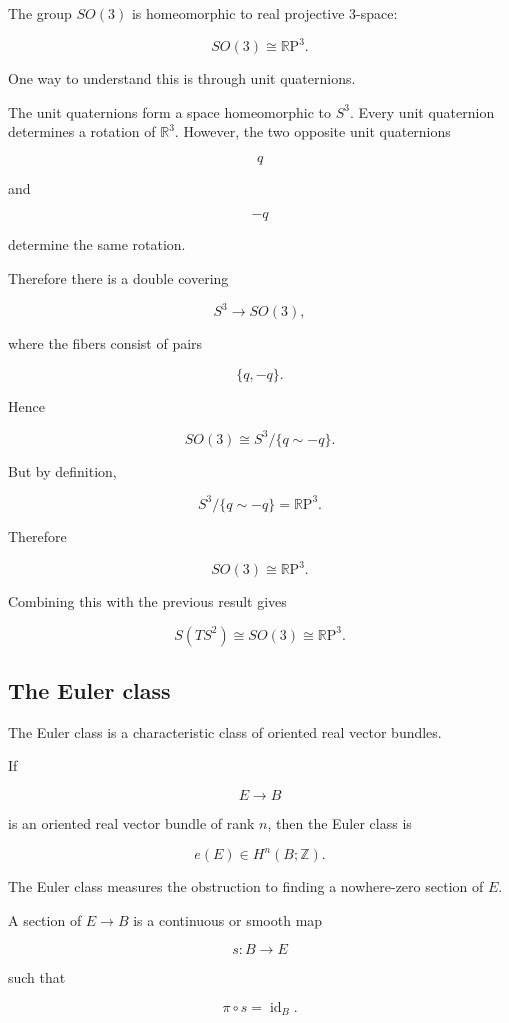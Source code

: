 \documentclass[12pt,a4paper]{article}
\newcommand{\RP}{\mathbb{R}\mathrm{P}}
\newcommand{\Z}{\mathbb{Z}}
\newcommand{\R}{\mathbb{R}}
\DeclareMathOperator{\id}{id}
\theoremstyle{notespace}
\begin{document}
	The group \(SO(3)\) is homeomorphic to real projective \(3\)-space:
	
	\[
	SO(3)\cong \RP^{3}.
	\]
	
	One way to understand this is through unit quaternions.
	
	The unit quaternions form a space homeomorphic to \(S^{3}\). Every unit quaternion determines a rotation of \(\R^{3}\). However, the two opposite unit quaternions
	
	\[
	q
	\]
	
	and
	
	\[
	-q
	\]
	
	determine the same rotation.
	
	Therefore there is a double covering
	
	\[
	S^{3}\to SO(3),
	\]
	
	where the fibers consist of pairs
	
	\[
	\{q,-q\}.
	\]
	
	Hence
	
	\[
	SO(3)\cong S^{3}/\{q\sim -q\}.
	\]
	
	But by definition,
	
	\[
	S^{3}/\{q\sim -q\}=\RP^{3}.
	\]
	
	Therefore
	
	\[
	\boxed{
		SO(3)\cong \RP^{3}.
	}
	\]
	
	Combining this with the previous result gives
	
	\[
	\boxed{
		S(TS^{2})\cong SO(3)\cong \RP^{3}.
	}
	\]
	
	\subsection{The Euler class}
	
	The Euler class is a characteristic class of oriented real vector bundles.
	
	If
	
	\[
	E\to B
	\]
	
	is an oriented real vector bundle of rank \(n\), then the Euler class is
	
	\[
	e(E)\in H^{n}(B;\Z).
	\]
	
	The Euler class measures the obstruction to finding a nowhere-zero section of \(E\).
	
	A section of \(E\to B\) is a continuous or smooth map
	
	\[
	s:B\to E
	\]
	
	such that
	
	\[
	\pi\circ s=\id_B.
	\]
	
\end{document}
